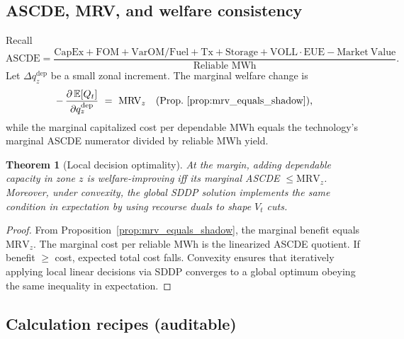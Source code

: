 \documentclass[11pt]{article}
\newcommand{\E}{\mathbb{E}}
\numberwithin{equation}{section}
\newtheorem{theorem}{Theorem}[section]
\theoremstyle{definition}
\theoremstyle{remark}
\begin{document}
\subsection{ ASCDE, MRV, and welfare consistency}
\label{sec:annexF_ASCDE_MRV}

Recall
\begin{equation}
\mathrm{ASCDE}=\frac{\mathrm{CapEx}+\mathrm{FOM}+\mathrm{VarOM/Fuel}+\mathrm{Tx}+\mathrm{Storage}
+\mathrm{VOLL}\cdot\mathrm{EUE}-\mathrm{Market\ Value}}{\text{Reliable MWh}}.
\end{equation}
Let $\Delta q^{\mathrm{dep}}_{z}$ be a small zonal increment. The marginal welfare change is
\begin{equation}
-\,\frac{\partial\,\E[Q_t]}{\partial q^{\mathrm{dep}}_{z}} \ =\ \mathrm{MRV}_{z}
\quad\text{(Prop.~\ref{prop:mrv_equals_shadow}),}
\end{equation}
while the marginal capitalized cost per dependable MWh equals the technology’s marginal ASCDE numerator divided by reliable MWh yield.

\begin{theorem}[Local decision optimality]\label{thm:local_optimality}
At the margin, adding dependable capacity in zone $z$ is welfare-improving iff its marginal ASCDE $\le \mathrm{MRV}_{z}$. Moreover, under convexity, the global SDDP solution implements the same condition in expectation by using recourse duals to shape $V_t$ cuts.
\end{theorem}

\begin{proof}
From Proposition~\ref{prop:mrv_equals_shadow}, the marginal benefit equals $\mathrm{MRV}_z$. The marginal cost per reliable MWh is the linearized ASCDE quotient. If benefit $\ge$ cost, expected total cost falls. Convexity ensures that iteratively applying local linear decisions via SDDP converges to a global optimum obeying the same inequality in expectation.
\end{proof}

\subsection{ Calculation recipes (auditable)}
\label{sec:annexF_calc_recipes}
\end{document}
